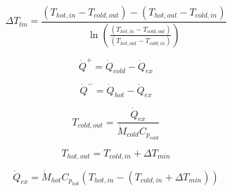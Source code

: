 \begin{equation}\label{eq:DTmintlm}
\Delta T_{lm}= \frac{(T_{hot,in}-T_{cold,out})-(T_{hot,out}-T_{cold,in})}{\ln\left(\frac{(T_{hot,in}-T_{cold,out})}{(T_{hot,out}-T_{cold,in})}\right)}
\end{equation}

\begin{equation}\label{eq:DTminq1}
\dot Q^+=\dot Q_{cold}-\dot Q_{ex}
\end{equation}

\begin{equation}\label{eq:DTminq2}
\dot Q^-=\dot Q_{hot}-\dot Q_{ex}
\end{equation}

\begin{equation}\label{eq:DTmintc}
T_{cold,out}=\frac{\dot Q_{ex}}{\dot M_{cold}C_{p_{cold}}}
\end{equation}

\begin{equation}\label{eq:DTminth}
T_{hot,out}=T_{cold,in}+\Delta T_{min}
\end{equation}

\begin{equation}\label{eq:DTminqex}
\dot Q_{ex} = \dot M_{hot}C_{p_{hot}}(T_{hot,in}-(T_{cold,in}+\Delta T_{min}))
\end{equation}